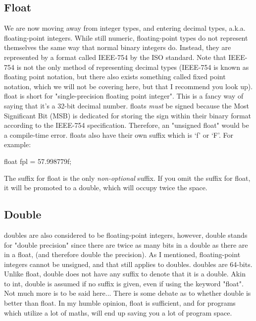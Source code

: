 \documentclass{article}
\begin{document}
\subsection{Float}

We are now moving away from integer types, and entering decimal types, a.k.a. floating-point integers. While
still numeric, floating-point types do not represent themselves the same way that normal binary integers do.
Instead, they are represented by a format called IEEE-754 by the ISO standard. Note that IEEE-754 is not the
only method of representing decimal types (IEEE-754 is known as floating point notation, but there also exists
something called fixed point notation, which we will not be covering here, but that I recommend you look up).
float is short for "single-precision floating point integer". This is a fancy way of saying that it’s a 32-bit
decimal number. floats \textit{must} be signed because the Most Significant Bit (MSB) is dedicated for storing
the sign within their binary format according to the IEEE-754 specification. Therefore, an "unsigned float"
would be a compile-time error. floats also have their own suffix which is ‘f’ or ‘F’. For example:

\begin{cblk}
float fpl = 57.998779f;
\end{cblk}

The suffix for float is the only \textit{non-optional} suffix. If you omit the suffix for float, it will be
promoted to a double, which will occupy twice the space.

\subsection{Double}

doubles are also considered to be floating-point integers, however, double stands for "double precision" since
there are twice as many bits in a double as there are in a float, (and therefore double the precision). As I
mentioned, floating-point integers cannot be unsigned, and that still applies to doubles. doubles are 64-bits.
Unlike float, double does not have any suffix to denote that it is a double. Akin to int, double is assumed if
no suffix is given, even if using the keyword "float". Not much more is to be said here... There is some debate
as to whether double is better than float. In my humble opinion, float is sufficient, and for programs which
utilize a lot of maths, will end up saving you a lot of program space.
\end{document}
